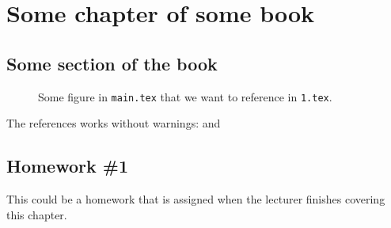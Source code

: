 \documentclass{book}
\begin{document}
\chapter{Some chapter of some book}
\section{Some section of the book}
\begin{figure}[htbp]
    \centering
    
    \caption{Some figure in \texttt{main.tex} that we want to reference in \texttt{1.tex}.}
    \label{fig:main}
\end{figure}
The references works without warnings:  and 
\section{Homework \#1}
This could be a homework that is assigned when the lecturer finishes covering this chapter.

\end{document}
